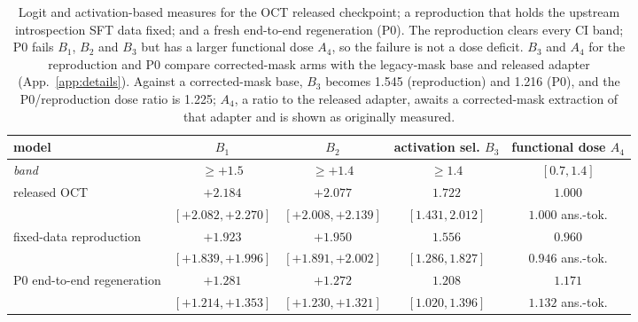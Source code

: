 \begin{table}[t]
\centering
\small\setlength{\tabcolsep}{4pt}
\begin{tabular}{lcccc}
\toprule
model & $B_1$ & $B_2$ & activation sel. $B_3$ & functional dose $A_4$ \\
\midrule
\emph{band} & $\geq +1.5$ & $\geq +1.4$ & $\geq 1.4$ & $[0.7, 1.4]$ \\
\midrule
released OCT & $+2.184$ & $+2.077$ & $1.722$ & $1.000$ \\
 & {\scriptsize $[+2.082, +2.270]$} & {\scriptsize $[+2.008, +2.139]$} & {\scriptsize $[1.431, 2.012]$} & {\scriptsize $1.000$ ans.-tok.} \\
\addlinespace
fixed-data reproduction & $+1.923$ & $+1.950$ & $1.556$ & $0.960$ \\
 & {\scriptsize $[+1.839, +1.996]$} & {\scriptsize $[+1.891, +2.002]$} & {\scriptsize $[1.286, 1.827]$} & {\scriptsize $0.946$ ans.-tok.} \\
\addlinespace
P0 end-to-end regeneration & $+1.281$ & $+1.272$ & $1.208$ & $1.171$ \\
 & {\scriptsize $[+1.214, +1.353]$} & {\scriptsize $[+1.230, +1.321]$} & {\scriptsize $[1.020, 1.396]$} & {\scriptsize $1.132$ ans.-tok.} \\
\bottomrule
\end{tabular}
\caption{Logit and activation-based measures for the OCT released checkpoint; a reproduction that holds the upstream introspection SFT data fixed; and a fresh end-to-end regeneration (P0). The reproduction clears every CI band; P0 fails $B_1$, $B_2$ and $B_3$ but has a larger functional dose $A_4$, so the failure is not a dose deficit. $B_3$ and $A_4$ for the reproduction and P0 compare corrected-mask arms with the legacy-mask base and released adapter (App.~\ref{app:details}). Against a corrected-mask base, $B_3$ becomes 1.545 (reproduction) and 1.216 (P0), and the P0/reproduction dose ratio is 1.225; $A_4$, a ratio to the released adapter, awaits a corrected-mask extraction of that adapter and is shown as originally measured.}
\label{tab:paraphrase-headline}
\end{table}
